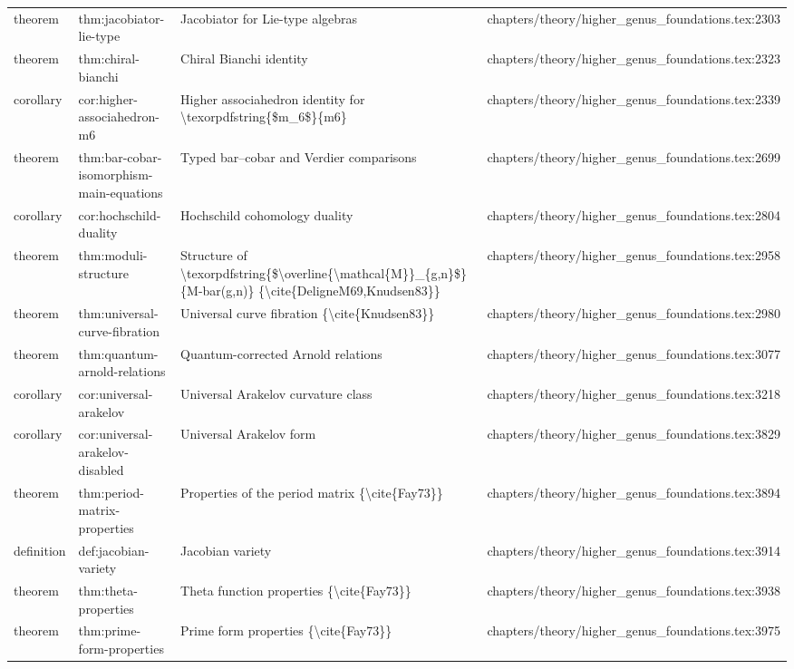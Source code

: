 \documentclass[11pt]{article}
\begin{document}
\begin{longtable}{L{0.10\textwidth}L{0.26\textwidth}L{0.42\textwidth}L{0.22\textwidth}}
theorem & thm:jacobiator-lie-type & Jacobiator for Lie-type algebras & chapters/theory/higher\_genus\_foundations.tex:2303\\
theorem & thm:chiral-bianchi & Chiral Bianchi identity & chapters/theory/higher\_genus\_foundations.tex:2323\\
corollary & cor:higher-associahedron-m6 & Higher associahedron identity for \textbackslash{}texorpdfstring\{\$m\_6\$\}\{m6\} & chapters/theory/higher\_genus\_foundations.tex:2339\\
theorem & thm:bar-cobar-isomorphism-main-equations & Typed bar--cobar and Verdier comparisons & chapters/theory/higher\_genus\_foundations.tex:2699\\
corollary & cor:hochschild-duality & Hochschild cohomology duality & chapters/theory/higher\_genus\_foundations.tex:2804\\
theorem & thm:moduli-structure & Structure of \textbackslash{}texorpdfstring\{\$\textbackslash{}overline\{\textbackslash{}mathcal\{M\}\}\_\{g,n\}\$\}\{M-bar(g,n)\} \{\textbackslash{}cite\{DeligneM69,Knudsen83\}\} & chapters/theory/higher\_genus\_foundations.tex:2958\\
theorem & thm:universal-curve-fibration & Universal curve fibration \{\textbackslash{}cite\{Knudsen83\}\} & chapters/theory/higher\_genus\_foundations.tex:2980\\
theorem & thm:quantum-arnold-relations & Quantum-corrected Arnold relations & chapters/theory/higher\_genus\_foundations.tex:3077\\
corollary & cor:universal-arakelov & Universal Arakelov curvature class & chapters/theory/higher\_genus\_foundations.tex:3218\\
corollary & cor:universal-arakelov-disabled & Universal Arakelov form & chapters/theory/higher\_genus\_foundations.tex:3829\\
theorem & thm:period-matrix-properties & Properties of the period matrix \{\textbackslash{}cite\{Fay73\}\} & chapters/theory/higher\_genus\_foundations.tex:3894\\
definition & def:jacobian-variety & Jacobian variety & chapters/theory/higher\_genus\_foundations.tex:3914\\
theorem & thm:theta-properties & Theta function properties \{\textbackslash{}cite\{Fay73\}\} & chapters/theory/higher\_genus\_foundations.tex:3938\\
theorem & thm:prime-form-properties & Prime form properties \{\textbackslash{}cite\{Fay73\}\} & chapters/theory/higher\_genus\_foundations.tex:3975\\

\end{longtable}
\end{document}
